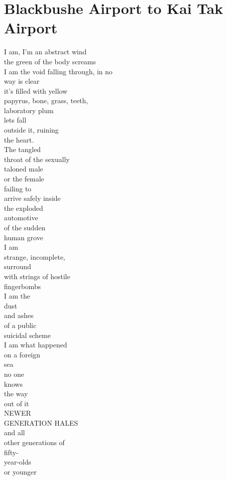 \documentclass[smalldemyvopaper,11pt,twoside,onecolumn,openright,extrafontsizes]{memoir}
\begin{document}
\chapter{Blackbushe Airport to Kai Tak Airport}
I am, I'm an abstract wind
\\the green of the body screams
\\I am the void falling through, in no
\\way is clear
\\it's filled with yellow
\\papyrus, bone, grass, teeth,
\\laboratory plum
\\lets fall
\\outside it, ruining
\\the heart.
\\The tangled
\\throat of the sexually
\\taloned male
\\or the female
\\failing to
\\arrive safely inside
\\the exploded
\\automotive
\\of the sudden
\\human grove
\\I am
\\strange, incomplete,
\\surround
\\with strings of hostile
\\fingerbombs
\\I am the
\\dust
\\and ashes
\\of a public
\\suicidal scheme
\\I am what happened
\\on a foreign
\\sea
\\no one
\\knows
\\the way
\\out of it
\\NEWER
\\GENERATION HALES
\\and all
\\other generations of
\\fifty-
\\year-olds
\\or younger
\end{document}
